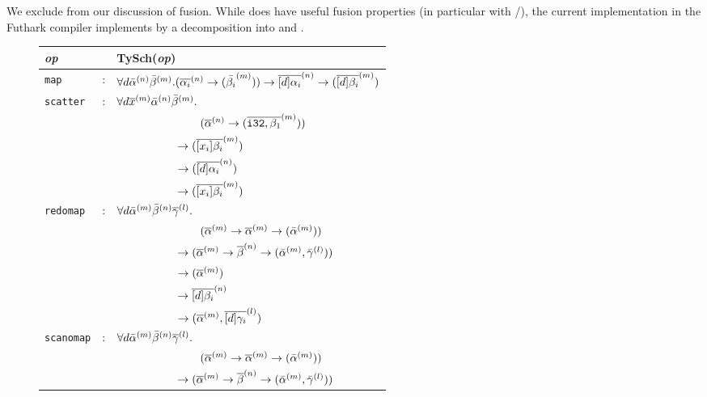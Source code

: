 We exclude  from our discussion of fusion.  While
 does have useful fusion properties (in particular with
/), the current implementation in the Futhark
compiler implements  by a decomposition into  and
.

\begin{figure}[hbt]
\begin{tabular}{lcl}
\emph{op} & & \textrm{TySch}(\emph{op}) \\ \hline
  {\lstinline!map!} & : & $\forall d \bar{\alpha}^{(n)}\bar{\beta}^{(m)}. (\overline{\alpha_{i}}^{(n)} \rightarrow (\bar{\beta_{i}}^{(m)})) \rightarrow \overline{[d]\alpha_{i}}^{(n)} \rightarrow (\overline{[d]\beta_{i}}^{(m)})$ \\
  {\lstinline!scatter!} & : & $\forall d \overline{x}^{(m)} \bar{\alpha}^{(n)}\bar{\beta}^{(m)}.$\\
          & & ~~~~~~~~~~~~~~ $(\overline{\alpha}^{(n)} \rightarrow (\overline{\texttt{i32}, \beta_{1}}^{(m)}))$\\
          & & ~~~~~~~~~~ $\rightarrow (\overline{[x_{i}]\beta_{i}}^{(m)})$\\
          & & ~~~~~~~~~~ $\rightarrow (\overline{[d]\alpha_i}^{(n)})$\\
          & & ~~~~~~~~~~ $\rightarrow (\overline{[x_{i}]\beta_i}^{(m)})$\\
  {\lstinline!redomap!} & : & $\forall d \bar{\alpha}^{(m)}\bar{\beta}^{(n)}\overline{\gamma}^{(l)}.$\\
          & & ~~~~~~~~~~~~~~ $(\overline{\alpha}^{(m)} \rightarrow \overline{\alpha}^{(m)} \rightarrow (\bar{\alpha}^{(m)}))$\\
          & & ~~~~~~~~~~ $\rightarrow (\overline{\alpha}^{(m)} \rightarrow \overline{\beta}^{(n)} \rightarrow (\bar{\alpha}^{(m)}, \bar{\gamma}^{(l)}))$ \\
          & & ~~~~~~~~~~ $\rightarrow (\overline{\alpha}^{(m)})$\\
          & & ~~~~~~~~~~ $\rightarrow \overline{[d]\beta_i}^{(n)}$\\
          & & ~~~~~~~~~~ $\rightarrow (\overline{\alpha}^{(m)},\overline{[d]\gamma_{i}}^{(l)})$ \\
  {\lstinline!scanomap!} & : & $\forall d \bar{\alpha}^{(m)}\bar{\beta}^{(n)}\overline{\gamma}^{(l)}.$\\
          & & ~~~~~~~~~~~~~~ $(\overline{\alpha}^{(m)} \rightarrow \overline{\alpha}^{(m)} \rightarrow (\bar{\alpha}^{(m)}))$\\
          & & ~~~~~~~~~~ $\rightarrow (\overline{\alpha}^{(m)} \rightarrow \overline{\beta}^{(n)} \rightarrow (\bar{\alpha}^{(m)}, \bar{\gamma}^{(l)}))$ \\

\end{tabular}
\end{figure}

